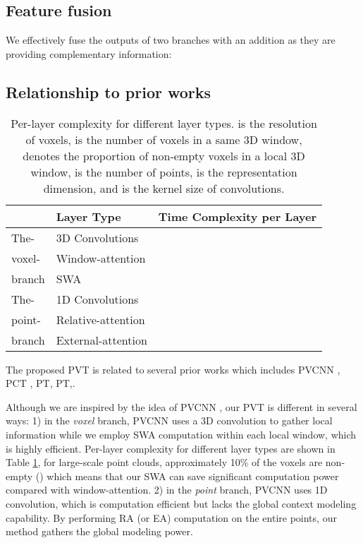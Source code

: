 \documentclass[10pt,twocolumn,letterpaper]{article}
\begin{document}
\subsection{Feature fusion} \label{3.3}
We effectively fuse the outputs of two branches with an addition as they are providing complementary information: 


\subsection{Relationship to prior works} \label{3.4} 
\begin{table}
\centering
\begin{center} 
    \begin{tabular}{|l|lc|}
    \hline
        & Layer Type      & Time Complexity per Layer  \\
    \hline
       The- & 3D Convolutions &  \\
       voxel-  & Window-attention &      \\
       branch  & SWA &      \\
       \hline
       The- & 1D Convolutions &   \\
       point- & Relative-attention &    \\
       branch & External-attention &    \\
  \hline
    \end{tabular}
    \end{center}
     \caption{Per-layer complexity for different layer types.  is the resolution of voxels,  is the number of voxels in a same 3D window,  denotes the proportion of non-empty voxels in a local 3D window,  is the number of points,  is the representation dimension, and  is the kernel size of convolutions.}
    \label{Complexity}
    
\end{table}

The proposed PVT is related to several prior works which includes PVCNN \cite{2019Point}, PCT \cite{guo2020pct}, PT\cite{Nico}, PT\cite{zhao2020point},.

Although we are inspired by the idea of PVCNN \cite{2019Point}, our PVT is different in several ways: 1) in the \emph{voxel} branch, PVCNN uses a 3D convolution to gather local information while we employ SWA computation within each local window, which is highly efficient. Per-layer complexity for different layer types are shown in Table \ref{Complexity}, for large-scale point clouds, approximately 10\% of the voxels are non-empty () \cite{xu2020grid} which means that our SWA can save significant computation power compared with window-attention.
2) in the \emph{point} branch, PVCNN uses 1D convolution, which is computation efficient but lacks the global context modeling capability. By performing RA (or EA) computation on the entire points, our method gathers the global modeling power.
\end{document}
